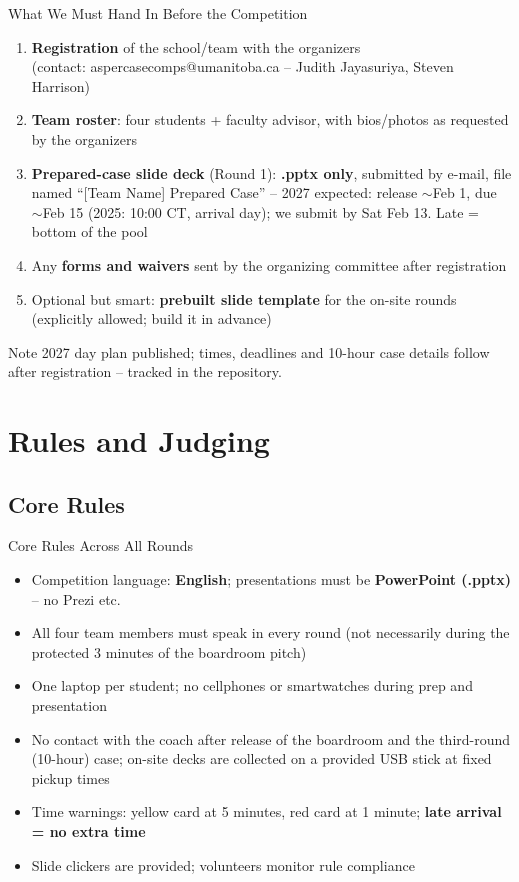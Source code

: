 \documentclass[aspectratio=169,11pt]{beamer}
\begin{document}
\begin{frame}{What We Must Hand In Before the Competition}
  \begin{enumerate}
    \item \textbf{Registration} of the school/team with the organizers \\
          (contact: aspercasecomps@umanitoba.ca -- Judith Jayasuriya, Steven Harrison)
    \item \textbf{Team roster}: four students + faculty advisor, with bios/photos as requested by the organizers
    \item \textbf{Prepared-case slide deck} (Round 1): \textbf{.pptx only}, submitted by e-mail, file named ``[Team Name] Prepared Case'' -- 2027 expected: release $\sim$Feb 1, due $\sim$Feb 15 (2025: 10:00 CT, arrival day); we submit by Sat Feb 13. Late = bottom of the pool
    \item Any \textbf{forms and waivers} sent by the organizing committee after registration
    \item Optional but smart: \textbf{prebuilt slide template} for the on-site rounds (explicitly allowed; build it in advance)
  \end{enumerate}
  \begin{alertblock}{Note}
    2027 day plan published; times, deadlines and 10-hour case details follow after registration -- tracked in the repository.
  \end{alertblock}
\end{frame}


\section{Rules and Judging}

\subsection{Core Rules}

\begin{frame}{Core Rules Across All Rounds}
  \begin{itemize}
    \item Competition language: \textbf{English}; presentations must be \textbf{PowerPoint (.pptx)} -- no Prezi etc.
    \item All four team members must speak in every round (not necessarily during the protected 3 minutes of the boardroom pitch)
    \item One laptop per student; no cellphones or smartwatches during prep and presentation
    \item No contact with the coach after release of the boardroom and the third-round (10-hour) case; on-site decks are collected on a provided USB stick at fixed pickup times
    \item Time warnings: yellow card at 5 minutes, red card at 1 minute; \textbf{late arrival = no extra time}
    \item Slide clickers are provided; volunteers monitor rule compliance
  \end{itemize}
\end{frame}
\end{document}
